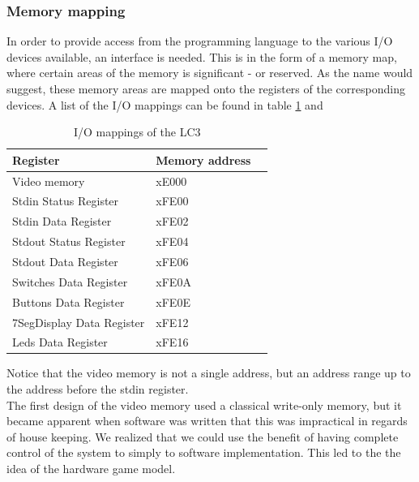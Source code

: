 \documentclass{acm_proc_article-sp}
\begin{document}
\subsubsection{Memory mapping}
In order to provide access from the programming language to the various I/O devices available, an interface is needed. This is in the form of a memory map, where certain areas of the memory is significant - or reserved. As the name would suggest, these memory areas are mapped onto the registers of the corresponding devices. A list of the I/O mappings can be found in table \ref{table:io_mappings} and \cite{patt2000introduction}

\begin{table}[h]
\centering
    \begin{tabular}{ | l | l | l |}
    \hline
     Register & Memory address \\ \hline 
    \hline
    Video memory           & xE000  \\ \hline
    Stdin Status Register  & xFE00  \\ \hline
    Stdin Data Register    & xFE02  \\ \hline
    Stdout Status Register & xFE04  \\ \hline
    Stdout Data Register   & xFE06  \\ \hline
    Switches Data Register & xFE0A  \\ \hline
    Buttons Data Register  & xFE0E  \\ \hline
    7SegDisplay Data Register  & xFE12  \\ \hline
    Leds Data Register  & xFE16  \\ \hline
    \end{tabular}
\caption{I/O mappings of the LC3}
\label{table:io_mappings}
\end{table}
Notice that the video memory is not a single address, but an address range up to the address before the stdin register.\\
The first design of the video memory used a classical write-only memory, but it became apparent when software was written that this was impractical in regards of house keeping. We realized that we could use the benefit of having complete control of the system to simply to software implementation. This led to the the idea of the hardware game model.
\end{document}
